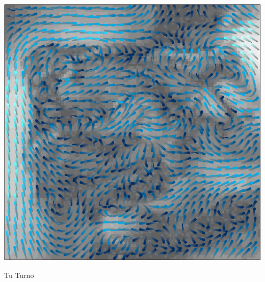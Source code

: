 \documentclass[xcolor={usenames,svgnames,dvipsnames}]{beamer}
\begin{document}
\begin{frame}[label=sec-5-3-3]{}
\includegraphics[width=.9\linewidth]{figs/streamplot.pdf}
\end{frame}

\begin{frame}[label=sec-5-3-4]{}
\begin{block}{Tu Turno}

\end{block}
\end{frame}
\end{document}
